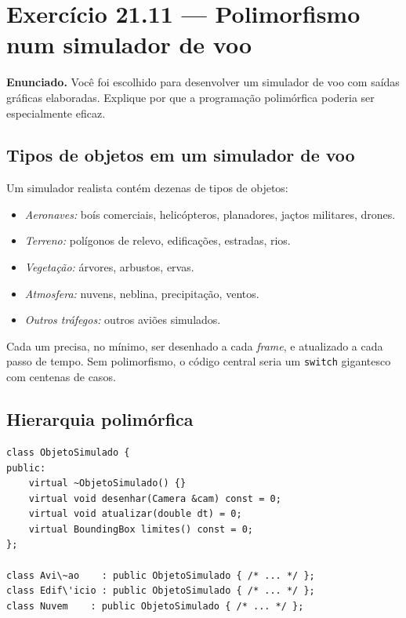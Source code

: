 \documentclass[11pt,a4paper]{article}
\begin{document}
\section{Exerc\'icio 21.11 --- Polimorfismo num simulador de voo}

\begin{enunciado}
\textbf{Enunciado.} Voc\^e foi escolhido para desenvolver um simulador de voo com sa\'idas gr\'aficas elaboradas. Explique por que a programa\c{c}\~ao polim\'orfica poderia ser especialmente eficaz.
\end{enunciado}

\subsection*{Tipos de objetos em um simulador de voo}

Um simulador realista cont\'em dezenas de tipos de objetos:

\begin{itemize}[leftmargin=*,itemsep=0pt]
  \item \emph{Aeronaves:} bo\'is comerciais, helic\'opteros, planadores, ja\c{c}tos militares, drones.
  \item \emph{Terreno:} pol\'igonos de relevo, edifica\c{c}\~oes, estradas, rios.
  \item \emph{Vegeta\c{c}\~ao:} \'arvores, arbustos, ervas.
  \item \emph{Atmosfera:} nuvens, neblina, precipita\c{c}\~ao, ventos.
  \item \emph{Outros tr\'afegos:} outros avi\~oes simulados.
\end{itemize}

Cada um precisa, no m\'inimo, ser desenhado a cada \emph{frame}, e atualizado a cada passo de tempo. Sem polimorfismo, o c\'odigo central seria um \texttt{switch} gigantesco com centenas de casos.

\subsection*{Hierarquia polim\'orfica}

\begin{lstlisting}[style=cppcode,numbers=none]
class ObjetoSimulado {
public:
    virtual ~ObjetoSimulado() {}
    virtual void desenhar(Camera &cam) const = 0;
    virtual void atualizar(double dt) = 0;
    virtual BoundingBox limites() const = 0;
};

class Avi\~ao    : public ObjetoSimulado { /* ... */ };
class Edif\'icio : public ObjetoSimulado { /* ... */ };
class Nuvem    : public ObjetoSimulado { /* ... */ };
\end{lstlisting}
\end{document}
